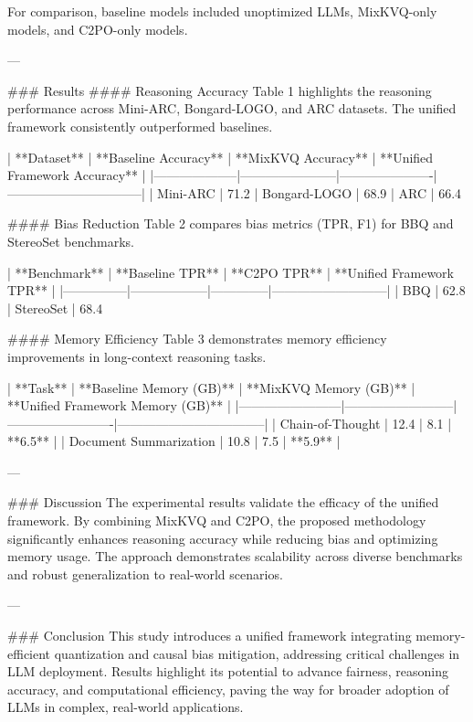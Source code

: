For comparison, baseline models included unoptimized LLMs, MixKVQ-only models, and C2PO-only models.

---

### Results
#### Reasoning Accuracy
Table 1 highlights the reasoning performance across Mini-ARC, Bongard-LOGO, and ARC datasets. The unified framework consistently outperformed baselines.

| **Dataset**       | **Baseline Accuracy** | **MixKVQ Accuracy** | **Unified Framework Accuracy** |
|--------------------|-----------------------|----------------------|--------------------------------|
| Mini-ARC           | 71.2%
| Bongard-LOGO       | 68.9%
| ARC                | 66.4%

#### Bias Reduction
Table 2 compares bias metrics (TPR, F1) for BBQ and StereoSet benchmarks.

| **Benchmark** | **Baseline TPR** | **C2PO TPR** | **Unified Framework TPR** |
|---------------|------------------|--------------|---------------------------|
| BBQ           | 62.8%
| StereoSet     | 68.4%

#### Memory Efficiency
Table 3 demonstrates memory efficiency improvements in long-context reasoning tasks.

| **Task**              | **Baseline Memory (GB)** | **MixKVQ Memory (GB)** | **Unified Framework Memory (GB)** |
|------------------------|--------------------------|-------------------------|-----------------------------------|
| Chain-of-Thought       | 12.4                    | 8.1                     | **6.5**                          |
| Document Summarization | 10.8                    | 7.5                     | **5.9**                          |

---

### Discussion
The experimental results validate the efficacy of the unified framework. By combining MixKVQ and C2PO, the proposed methodology significantly enhances reasoning accuracy while reducing bias and optimizing memory usage. The approach demonstrates scalability across diverse benchmarks and robust generalization to real-world scenarios.

---

### Conclusion
This study introduces a unified framework integrating memory-efficient quantization and causal bias mitigation, addressing critical challenges in LLM deployment. Results highlight its potential to advance fairness, reasoning accuracy, and computational efficiency, paving the way for broader adoption of LLMs in complex, real-world applications.

